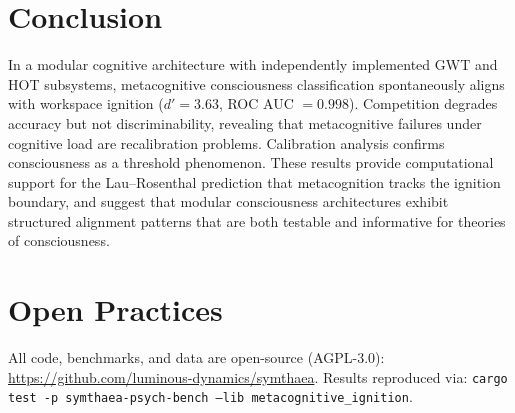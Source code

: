 \documentclass[10pt,letterpaper]{article}
\newcommand{\dprime}{d'}
\begin{document}
\section{Conclusion}

In a modular cognitive architecture with independently implemented GWT
and HOT subsystems, metacognitive consciousness classification
spontaneously aligns with workspace ignition ($\dprime = 3.63$,
ROC AUC $= 0.998$).  Competition degrades accuracy but not
discriminability, revealing that metacognitive failures under cognitive
load are recalibration problems.  Calibration analysis confirms
consciousness as a threshold phenomenon.  These results provide
computational support for the Lau--Rosenthal prediction that
metacognition tracks the ignition boundary, and suggest that modular
consciousness architectures exhibit structured alignment patterns
that are both testable and informative for theories of consciousness.


\section*{Open Practices}

All code, benchmarks, and data are open-source (AGPL-3.0):
\url{https://github.com/luminous-dynamics/symthaea}.
Results reproduced via: \texttt{cargo test -p symthaea-psych-bench --lib metacognitive\_ignition}.




\end{document}
